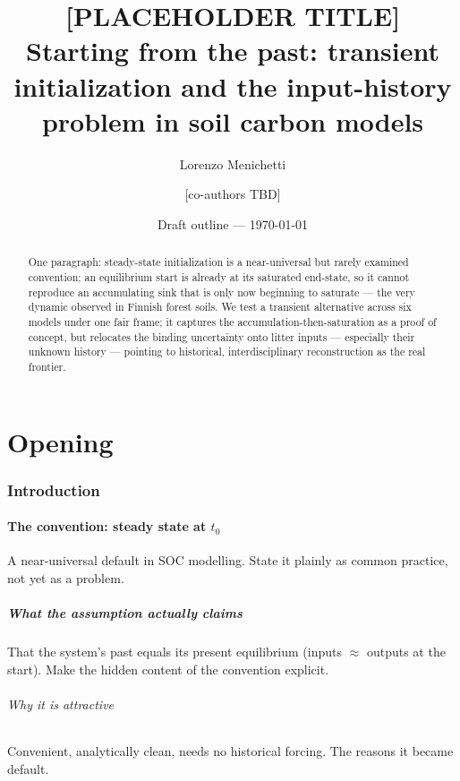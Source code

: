 \documentclass[11pt]{article}
\title{[PLACEHOLDER TITLE]\\
  \large Starting from the past: transient initialization and the
  input-history problem in soil carbon models}
\author{Lorenzo Menichetti \and [co-authors TBD]}
\date{Draft outline --- \today}
\begin{document}
\maketitle

\begin{abstract}
 One paragraph: steady-state initialization
is a near-universal but rarely examined convention; an equilibrium start is
already at its saturated end-state, so it cannot reproduce an accumulating
sink that is only now beginning to saturate --- the very dynamic observed in
Finnish forest soils. We test a transient alternative across six models under
one fair frame; it captures the accumulation-then-saturation as a proof of
concept, but relocates the binding uncertainty onto litter inputs ---
especially their unknown history --- pointing to historical, interdisciplinary
reconstruction as the real frontier.
\end{abstract}

\tableofcontents

\part{Opening}

\section{Introduction}

\subsection{The convention: steady state at $t_0$}
A near-universal default in SOC modelling. State it plainly as common
practice, not yet as a problem.

\subsubsection{What the assumption actually claims}
That the system's past equals its present equilibrium (inputs $\approx$
outputs at the start). Make the hidden content of the convention explicit.

\paragraph{Why it is attractive}
Convenient, analytically clean, needs no historical forcing. The reasons it
became default.
\end{document}

